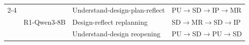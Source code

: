 \begin{table}[t]
\begin{threeparttable}
\begin{tabular}{llll}
\cmidrule(lr){2-4}

& \multirow{3}{*}{R1-Qwen3-8B} &
Understand-design-plan-reflect & PU$\rightarrow$SD$\rightarrow$IP$\rightarrow$MR\\
& & \cellcolor{gray!15}Design-reflect replanning &\cellcolor{gray!15}SD$\rightarrow$MR$\rightarrow$SD$\rightarrow$IP\\
& & \cellcolor{gray!15}Understand-design reopening &\cellcolor{gray!15}PU$\rightarrow$SD$\rightarrow$PU$\rightarrow$SD\\

% 
% 
\bottomrule
\end{tabular}

\end{threeparttable}
\end{table}

